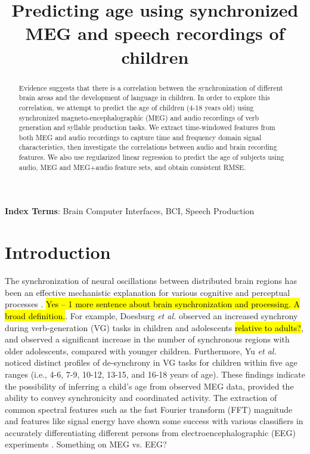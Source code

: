 \documentclass[a4paper]{article}
\title{Predicting age using synchronized MEG and speech recordings of children}
\newcommand{\FR}[1]{{\small \textcolor{red}{\hl{#1}}}}
\begin{document}
\maketitle
% 
\begin{abstract}
Evidence suggests that there is a correlation between the synchronization of different brain areas and the development of language in children. In order to explore this correlation, we attempt to predict the age of children (4-18 years old) using synchronized magneto-encephalographic (MEG) and audio recordings of verb generation and syllable production tasks. We extract time-windowed features from both MEG and audio recordings to capture time and frequency domain signal characteristics, then investigate the correlations between audio and brain recording features. We also use regularized linear regression to predict the age of subjects using audio, MEG and MEG+audio feature sets, and obtain consistent RMSE. 
\end{abstract}


\noindent\textbf{Index Terms}: Brain Computer Interfaces, BCI, Speech Production

\section{Introduction}

The synchronization of neural oscillations between distributed brain regions has been an effective mechanistic explanation for various cognitive and perceptual processes \cite{Fries2015,Nakasaki1989,NeuralSync}. \FR{Yes -- 1 more sentence about brain synchronization and processing. A broad definition.}. For example, Doesburg {\em et al.} \cite{Doesburg2016} observed an increased synchrony during verb-generation (VG) tasks in children and adolescents \FR{relative to adults?}, and observed a significant increase in the number of synchronous regions with older adolescents, compared with younger children. Furthermore, Yu {\em et al.} \cite{Yu2014} noticed distinct profiles of de-synchrony in VG tasks for children within five age ranges (i.e., 4-6, 7-9, 10-12, 13-15, and 16-18 years of age). These findings indicate the possibility of inferring a child's age from observed MEG data, provided the ability to convey synchronicity and coordinated activity. The extraction of common spectral features such as the fast Fourier transform (FFT) magnitude and features like signal energy have shown some success with various classifiers in accurately differentiating different persons from electroencephalographic (EEG) experiments \cite{Nguyen2012} \cite{Poulos2001}. Something on MEG vs. EEG?
\end{document}
